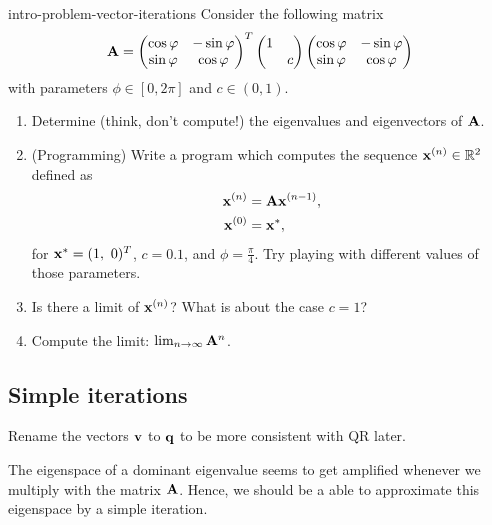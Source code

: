 
\begin{Problem}{intro-problem-vector-iterations}
	Consider the following matrix
	\begin{gather*}
	\mathbf A =
	\begin{pmatrix}
	\cos\varphi & -\sin\varphi\\
	\sin\varphi &  \cos\varphi
	\end{pmatrix}^T
	\begin{pmatrix}
	1 & \\
	& c
	\end{pmatrix}
	\begin{pmatrix}
	\cos\varphi & -\sin\varphi\\
	\sin\varphi &  \cos\varphi
	\end{pmatrix}
	\end{gather*}
	with parameters $\phi\in[0,2\pi]$ and $c\in(0,1)$.
	\begin{enumerate}
		\item Determine (think, don't compute!) the eigenvalues and eigenvectors of $\mathbf A$.
		\item (Programming) Write a program which computes the sequence
		$\mathbf x^{(n)}\in\mathbb R^2$ defined as
		\begin{align*}
		\mathbf x^{(n)} &= \mathbf A \mathbf x^{(n-1)}, \\
		\mathbf x^{(0)} &= \mathbf x^{*},
		\end{align*}
		for $\vx^{*} = (1,\ 0)^T$, $c = 0.1$, and
		$\phi=\frac\pi4$. Try playing with different values of those
		parameters.
		\item Is there a limit of $\mathbf x^{(n)}$? What is about the case
		$c=1$?
		\item Compute the limit: $\lim_{n\to\infty}\mathbf A^n$.
	\end{enumerate}
\end{Problem}


\subsection{Simple iterations}

\begin{todo}
  Rename the vectors $\mathbf v$ to $\mathbf q$ to be more consistent with QR later.
\end{todo}

\begin{intro}
  The eigenspace of a dominant eigenvalue seems to get amplified
  whenever we multiply with the matrix $\mathbf A$. Hence, we should be a
  able to approximate this eigenspace by a simple iteration.
\end{intro}

